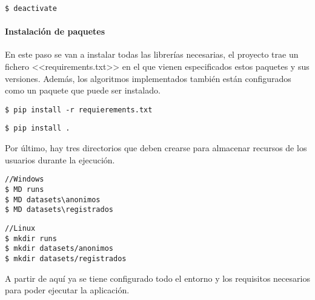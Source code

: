 \begin{tcolorbox}[colback=cyan!5!white,colframe=cyan!75!black,title=Para desactivar el entorno (una vez en él)]
\begin{verbatim}
$ deactivate
\end{verbatim}
\end{tcolorbox}
\paragraph{Instalación de paquetes} En este paso se van a instalar todas las
librerías necesarias, el proyecto trae un fichero <<requirements.txt>> en el que
vienen especificados estos paquetes y sus versiones. Además, los algoritmos
implementados también están configurados como un paquete que puede ser
instalado.
\begin{tcolorbox}[colback=cyan!5!white,colframe=orange!75!black,title=Instalar librerías externas]
\begin{verbatim}
$ pip install -r requierements.txt
\end{verbatim}
\end{tcolorbox}

\begin{tcolorbox}[colback=cyan!5!white,colframe=orange!75!black,title=Instalar resto de paquetes (definidos en setup.py)]
\begin{verbatim}
$ pip install .
\end{verbatim}
\end{tcolorbox}

Por último, hay tres directorios que deben crearse para almacenar recursos de
los usuarios durante la ejecución.

\begin{tcolorbox}[colback=cyan!5!white,colframe=cyan!75!black,fontupper=\footnotesize,fontlower=\footnotesize,title=Creación de directorios (desde \texttt{/web/app})]
\begin{verbatim}
//Windows
$ MD runs
$ MD datasets\anonimos
$ MD datasets\registrados
\end{verbatim}
\tcblower
\begin{verbatim}
//Linux
$ mkdir runs
$ mkdir datasets/anonimos
$ mkdir datasets/registrados
\end{verbatim}
\end{tcolorbox}


A partir de aquí ya se tiene configurado todo el entorno y los requisitos
necesarios para poder ejecutar la aplicación.

